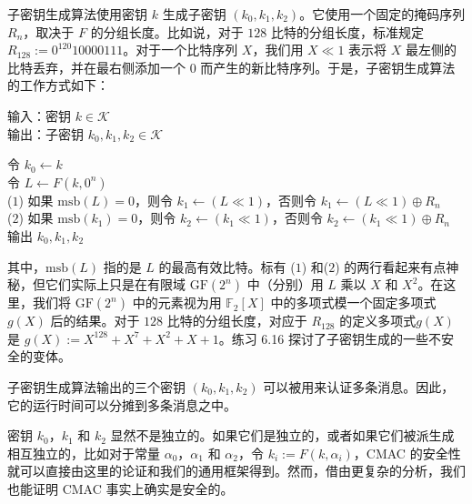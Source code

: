 \begin{snote}[子密钥生成。]
子密钥生成算法使用密钥 $k$ 生成子密钥 $(k_0,k_1,k_2)$。它使用一个固定的掩码序列 $R_n$，取决于 $F$ 的分组长度。比如说，对于 $128$ 比特的分组长度，标准规定 $R_{128}:=0^{120}10000111$。对于一个比特序列 $X$，我们用 $X\ll1$ 表示将 $X$ 最左侧的比特丢弃，并在最右侧添加一个 $0$ 而产生的新比特序列。于是，子密钥生成算法的工作方式如下：

\vspace{5pt}

\hspace*{5pt} 输入：密钥 $k\in\mathcal{K}$\\
\hspace*{26pt} 输出：子密钥 $k_0,k_1,k_2\in\mathcal{K}$

\vspace{3pt}

\hspace*{5pt} 令 $k_0\leftarrow k$\\
\hspace*{26pt} 令 $L\leftarrow F(k,0^n)$\\
\hspace*{1pt} ($1$)
\hspace*{4.5pt} 如果 $\mathrm{msb}(L)=0$，则令 $k_1\leftarrow (L\ll1)$，否则令 $k_1\leftarrow(L\ll1)\oplus R_n$\\
\hspace*{1pt} ($2$)
\hspace*{4.5pt} 如果 $\mathrm{msb}(k_1)=0$，则令 $k_2\leftarrow (k_1\ll1)$，否则令 $k_2\leftarrow(k_1\ll1)\oplus R_n$\\
\hspace*{26pt} 输出 $k_0,k_1,k_2$

\vspace{5pt}

\noindent
其中，$\mathrm{msb}(L)$ 指的是 $L$ 的最高有效比特。标有 ($1$) 和($2$) 的两行看起来有点神秘，但它们实际上只是在有限域 $\mathrm{GF}(2^n)$ 中（分别）用 $L$ 乘以 $X$ 和 $X^2$。在这里，我们将 $\mathrm{GF}(2^n)$ 中的元素视为用 $\mathbb{F}_2[X]$ 中的多项式模一个固定多项式 $g(X)$ 后的结果。对于 $128$ 比特的分组长度，对应于 $R_{128}$ 的定义多项式$g(X)$ 是 $g(X):=X^{128}+X^7+X^2+X+1$。练习 6.16 探讨了子密钥生成的一些不安全的变体。

子密钥生成算法输出的三个密钥 $(k_0,k_1,k_2)$ 可以被用来认证多条消息。因此，它的运行时间可以分摊到多条消息之中。

密钥 $k_0$，$k_1$ 和 $k_2 $ 显然不是独立的。如果它们是独立的，或者如果它们被派生成相互独立的，比如对于常量 $\alpha_0$，$\alpha_1$ 和 $\alpha_2$，令 $k_i:=F(k,\alpha_i)$，CMAC 的安全性就可以直接由这里的论证和我们的通用框架得到。然而，借由更复杂的分析，我们也能证明 CMAC 事实上确实是安全的。
\end{snote}